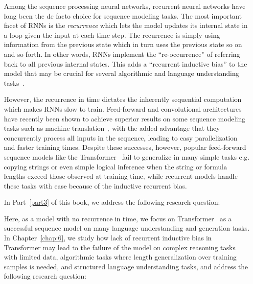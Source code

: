 Among the sequence processing neural networks, recurrent neural networks have long been the de facto choice for sequence modeling tasks. The most important facet of RNNs is the \emph{recurrence} which lets the model updates its internal state in a loop given the input at each time step. The recurrence is simply using information from the previous state which in turn uses the previous state so on and so forth.  In other words, RNNs implement the ``re-occurrence'' of referring back to all previous internal states. This adds a ``recurrent inductive bias'' to the model that may be crucial for several algorithmic and language understanding tasks~\cite{tran2016recurrent,Dehghani:ICLR:2019}.

However, the recurrence in time dictates the inherently sequential computation which makes RNNs slow to train. Feed-forward and convolutional architectures have recently been shown to achieve superior results on some sequence modeling tasks such as machine translation~\citep{vaswani2017attention, NalBytenet2017}, with the added advantage that they concurrently process all inputs in the sequence, leading to easy parallelization and faster training times. Despite these successes, however, popular feed-forward sequence models like the Transformer~\citep{vaswani2017attention} fail to generalize in many simple tasks e.g. copying strings or even simple logical inference when the string or formula lengths exceed those observed at training time, while recurrent models handle these tasks with ease because of the inductive recurrent bias.

In Part~\ref{part3} of this book, we address the following research question:

Here, as a model with no recurrence in time, we focus on Transformer~\citep{vaswani2017attention} as a successful sequence model on many language understanding and generation tasks. In Chapter~\ref{chap:6}, we study how lack of recurrent inductive bias in Transformer may lead to the failure of the model on complex reasoning tasks with limited data, algorithmic tasks where length generalization over training samples is needed, and structured language understanding tasks, and address the following research question:

